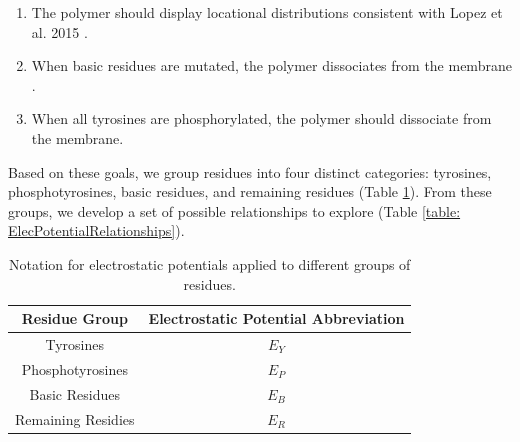 \documentclass[../../AdvancementSummary.tex]{subfiles}
\begin{document}
\begin{enumerate}
	\item The polymer should display locational distributions consistent with Lopez et al. 2015 \cite{Lopez2015}.
	\item When basic residues are mutated, the polymer dissociates from the membrane \cite{Zhang2011}.
	\item When all tyrosines are phosphorylated, the polymer should dissociate from the membrane. 
\end{enumerate}

Based on these goals, we group residues into four distinct categories: tyrosines, phosphotyrosines, basic residues, and remaining residues (Table \ref{table: ElecPotentialNotation}). From these groups, we develop a set of possible relationships to explore (Table \ref{table: ElecPotentialRelationships}). 

\begin{table}[H]
\caption{Notation for electrostatic potentials applied to different groups of residues. \label{table: ElecPotentialNotation}}
\begin{center}
\begin{tabular}{ c | c}
\hline
Residue Group & Electrostatic Potential Abbreviation \\
\hline
Tyrosines & $E_Y$ \\
Phosphotyrosines & $E_P$ \\
Basic Residues & $E_B$ \\
Remaining Residies & $E_R$ \\
\hline
\end{tabular}
\end{center}
\end{table}
\end{document}
